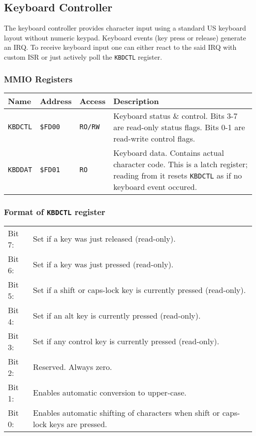 \documentclass[a4paper,10pt,oneside]{article}
\begin{document}
\subsection{Keyboard Controller}
The keyboard controller provides character input using a standard US keyboard layout without numeric keypad. Keyboard events (key press or release) generate an IRQ. To receive keyboard input one can either react to the said IRQ with custom ISR or just actively poll the \texttt{KBDCTL} register.

\subsubsection*{MMIO Registers}
\begin{tabularx}{\textwidth}{l | l | l | X }
  \textbf{Name} & \textbf{Address} & \textbf{Access} & \textbf{Description} \\ \hline
  \texttt{KBDCTL} & \texttt{\$FD00} & \texttt{RO/RW} &
  Keyboard status \& control. Bits 3-7 are read-only status flags. Bits 0-1 are read-write control flags. \\ \hline
  \texttt{KBDDAT} & \texttt{\$FD01} & \texttt{RO} &
  Keyboard data. Contains actual character code. This is a latch register; reading from it resets \texttt{KBDCTL} as if no keyboard event occured. \\
\end{tabularx}

\subsubsection*{Format of \texttt{KBDCTL} register}
\begin{tabularx}{\textwidth}{l l}
  Bit 7: & Set if a key was just released (read-only). \\
  Bit 6: & Set if a key was just pressed (read-only). \\
  Bit 5: & Set if a shift or caps-lock key is currently pressed (read-only). \\
  Bit 4: & Set if an alt key is currently pressed (read-only). \\
  Bit 3: & Set if any control key is currently pressed (read-only).  \\
  Bit 2: & Reserved. Always zero. \\
  Bit 1: & Enables automatic conversion to upper-case.  \\
  Bit 0: & Enables automatic shifting of characters when shift or caps-lock keys are pressed. \\
\end{tabularx}
\end{document}
